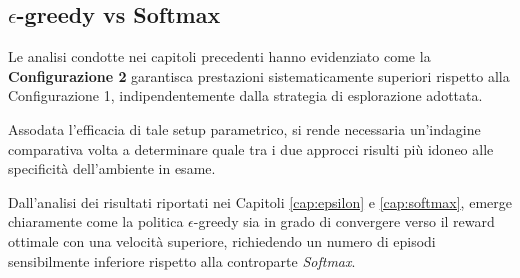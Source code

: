 \documentclass[12pt,a4paper]{article}
\begin{document}
\subsection{$\epsilon$-greedy vs Softmax}
Le analisi condotte nei capitoli precedenti hanno evidenziato come la \textbf{Configurazione 2} garantisca prestazioni sistematicamente superiori rispetto alla Configurazione 1, indipendentemente dalla strategia di esplorazione adottata. 

Assodata l'efficacia di tale setup parametrico, si rende necessaria un'indagine comparativa volta a determinare quale tra i due approcci risulti più idoneo alle specificità dell'ambiente in esame. 

Dall'analisi dei risultati riportati nei Capitoli \ref{cap:epsilon} e \ref{cap:softmax}, emerge chiaramente come la politica $\epsilon$-greedy sia in grado di convergere verso il reward ottimale con una velocità superiore, richiedendo un numero di episodi sensibilmente inferiore rispetto alla controparte \textit{Softmax}.
\end{document}
